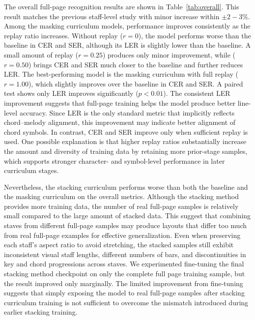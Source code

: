 \documentclass{article}
\begin{document}
The overall full-page recognition results are shown in Table~\ref{tab:overall}. This result matches the previous staff-level study with minor increase within $\pm 2-3\%$. Among the masking curriculum models, performance improves consistently as the replay ratio increases. Without replay ($r=0$), the model performs worse than the baseline in CER and SER, although its LER is slightly lower than the baseline. A small amount of replay ($r=0.25$) produces only minor improvement, while ($r=0.50$) brings CER and SER much closer to the baseline and further reduces LER. The best-performing model is the masking curriculum with full replay ($r=1.00$), which slightly improves over the baseline in CER and SER. A paired test shows only LER improves significantly ($p<0.01$). The consistent LER improvement suggests that full-page training helps the model produce better line-level accuracy. Since LER is the only standard metric that implicitly reflects chord–melody alignment, this improvement may indicate better alignment of chord symbols. In contrast, CER and SER improve only when sufficient replay is used. One possible explanation is that higher replay ratios substantially increase the amount and diversity of training data by retaining more prior-stage samples, which supports stronger character- and symbol-level performance in later curriculum stages.

Nevertheless, the stacking curriculum performs worse than both the baseline and the masking curriculum on the overall metrics. Although the stacking method provides more training data, the number of real full-page samples is relatively small compared to the large amount of stacked data. This suggest that combining staves from different full-page samples may produce layouts that differ too much from real full-page examples for effective generalization. Even when preserving each staff’s aspect ratio to avoid stretching, the stacked samples still exhibit inconsistent visual staff lengths, different numbers of bars, and discontinuities in key and chord progressions across staves. We experimented fine-tuning the final stacking method checkpoint on only the complete full page training sample, but the result improved only marginally. The limited improvement from fine-tuning suggests that simply exposing the model to real full-page samples after stacking curriculum training is not sufficient to overcome the mismatch introduced during earlier stacking training. 
\end{document}
